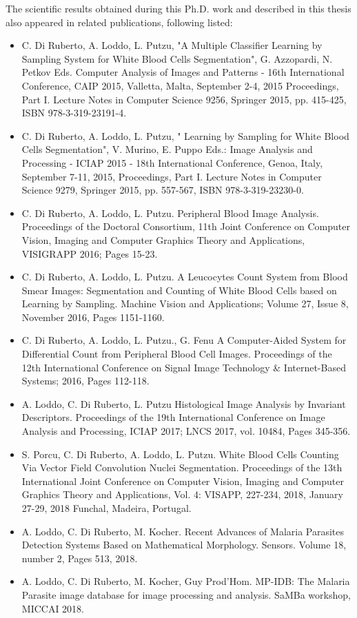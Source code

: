 \documentclass[final,a4paper,12pt,english]{UnicaPhdThesis3}
\begin{document}
The scientific results obtained during this Ph.D. work and described in this thesis also appeared in related publications, following listed:
\begin{itemize}
\item C. Di Ruberto, A. Loddo, L. Putzu, "A Multiple Classifier Learning by Sampling System for White Blood Cells Segmentation", G. Azzopardi, N. Petkov Eds. Computer Analysis of Images and Patterns - 16th International Conference, CAIP 2015, Valletta, Malta, September 2-4, 2015 Proceedings, Part I. Lecture Notes in Computer Science 9256, Springer 2015, pp. 415-425, ISBN 978-3-319-23191-4.
\item C. Di Ruberto, A. Loddo, L. Putzu, " Learning by Sampling for White Blood Cells Segmentation", V. Murino, E. Puppo Eds.: Image Analysis and Processing - ICIAP 2015 - 18th International Conference, Genoa, Italy, September 7-11, 2015, Proceedings, Part I. Lecture Notes in Computer Science 9279, Springer 2015, pp. 557-567,  ISBN 978-3-319-23230-0. 
\item C. Di Ruberto, A. Loddo, L. Putzu. Peripheral Blood Image Analysis. Proceedings of the Doctoral Consortium, 11th Joint Conference on Computer Vision, Imaging and Computer Graphics Theory and Applications, VISIGRAPP 2016; Pages 15-23.
\item C. Di Ruberto, A. Loddo, L. Putzu. A Leucocytes Count System from Blood Smear Images: Segmentation and Counting of White Blood Cells based on Learning by Sampling. Machine Vision and Applications; Volume 27, Issue 8, November 2016, Pages 1151-1160.
\item C. Di Ruberto, A. Loddo, L. Putzu., G. Fenu A Computer-Aided System for Differential Count from Peripheral Blood Cell Images. Proceedings of the 12th International Conference on Signal Image Technology \& Internet-Based Systems; 2016, Pages 112-118.
\item A. Loddo, C. Di Ruberto, L. Putzu Histological Image Analysis by Invariant Descriptors. Proceedings of the 19th International Conference on Image Analysis and Processing, ICIAP 2017; LNCS 2017, vol. 10484, Pages 345-356.
\item S. Porcu, C. Di Ruberto, A. Loddo, L. Putzu. White Blood Cells Counting Via Vector Field Convolution Nuclei Segmentation. Proceedings of the 13th International Joint Conference on Computer Vision, Imaging and Computer Graphics Theory and Applications, Vol. 4: VISAPP, 227-234, 2018, January 27-29, 2018 Funchal, Madeira, Portugal.
\item A. Loddo, C. Di Ruberto, M. Kocher. Recent Advances of Malaria Parasites Detection Systems Based on Mathematical Morphology. Sensors. Volume 18, number 2, Pages 513, 2018.
\item A. Loddo, C. Di Ruberto, M. Kocher, Guy Prod'Hom. MP-IDB: The Malaria Parasite image database for image processing and analysis. SaMBa workshop, MICCAI 2018.
\end{itemize}
\end{document}
